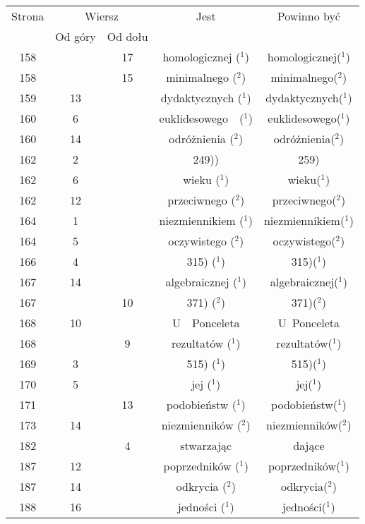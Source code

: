 \documentclass[a4paper,11pt]{article}
\numberwithin{equation}{section}
\begin{document}
\begin{center}
  \begin{tabular}{|c|c|c|c|c|}
    \hline
    Strona & \multicolumn{2}{c|}{Wiersz} & Jest
                              & Powinno być \\ \cline{2-3}
    & Od góry & Od dołu & & \\
    \hline
    158 & & 17 & homologicznej ($^{ 1 }$) & homologicznej($^{ 1 }$) \\
    158 & & 15 & minimalnego ($^{ 2 }$) & minimalnego($^{ 2 }$) \\
    159 & 13 & & dydaktycznych ($^{ 1 }$) & dydaktycznych($^{ 1 }$) \\
    160 &  6 & & euklidesowego~~($^{ 1 }$) & euklidesowego($^{ 1 }$) \\
    160 & 14 & & odróżnienia ($^{ 2 }$) & odróżnienia($^{ 2 }$) \\
    162 &  2 & & 249)) & 259) \\
    162 &  6 & & wieku ($^{ 1 }$) & wieku($^{ 1 }$) \\
    162 & 12 & & przeciwnego ($^{ 2 }$) & przeciwnego($^{ 2 }$) \\
    164 &  1 & & niezmiennikiem ($^{ 1 }$) & niezmiennikiem($^{ 1 }$) \\
    164 &  5 & & oczywistego ($^{ 2 }$) & oczywistego($^{ 2 }$) \\
    166 &  4 & & 315) ($^{ 1 }$) & 315)($^{ 1 }$) \\
    167 & 14 & & algebraicznej ($^{ 1 }$) & algebraicznej($^{ 1 }$) \\
    167 & & 10 & 371) ($^{ 2 }$) & 371)($^{ 2 }$) \\
    168 & 10 & & U~~Ponceleta & U~Ponceleta \\
    168 & &  9 & rezultatów ($^{ 1 }$) & rezultatów($^{ 1 }$) \\
    169 &  3 & & 515) ($^{ 1 }$) & 515)($^{ 1 }$) \\
    170 &  5 & & jej ($^{ 1 }$) & jej($^{ 1 }$) \\
    171 & & 13 & podobieństw ($^{ 1 }$) & podobieństw($^{ 1 }$) \\
    173 & 14 & & niezmienników ($^{ 2 }$) & niezmienników($^{ 2 }$) \\
    182 & &  4 & stwarzając & dające \\
    187 & 12 & & poprzedników ($^{ 1 }$) & poprzedników($^{ 1 }$) \\
    187 & 14 & & odkrycia ($^{ 2 }$) & odkrycia($^{ 2 }$) \\
    188 & 16 & & jedności ($^{ 1 }$) & jedności($^{ 1 }$) \\

\end{tabular}
\end{center}
\end{document}
